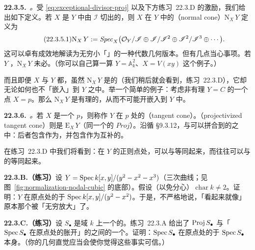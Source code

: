 \textbf{22.3.5.}\ \emph{\trNormal\trCone。}\quad 受 \eqref{eq:exceptional-divisor-proj} 以及下方\mbox{练习~22.3.D} 的激励，我们给出如下定义。若 $X$ 是 $Y$ 中由 $\mathscr{I}$ 切出的\trClosedSubscheme，则 $X$ 在 $Y$ 中的\textbf{\trNormal\trCone}（normal cone）$\mathrm{N}_X\,Y$ 定义为
\[
\tag{22.3.5.1}\label{eq:normal-cone}
\mathrm{N}_X\,Y:=\mathit{Spec}_X\bigl(\mathcal{O}_Y/\mathscr{I}\oplus\mathscr{I}/\mathscr{I}^2\oplus\mathscr{I}^2/\mathscr{I}^3\oplus\cdots\bigr).
\]
这可以卓有成效地解读为无穷小「\trTubularNeighborhood」的一种代数几何版本。但有几点当心事项。若 $Y$ \trSmooth，$\mathrm{N}_X\,Y$ 未必\trSmooth。（你可以自己算一算 $Y=\mathbb{A}^2_k$、$X=V(xy)$ 这个例子。）

而且即便 $X$ 与 $Y$ 都\trSmooth，虽然 $\mathrm{N}_X\,Y$ 是\trSmooth{}的（我们稍后就会看到，\mbox{练习~22.3.D}），它却无论如何也不「嵌入」到 $Y$ 之中。举一个简单的例子：考虑非有理\trCurve{} $Y=C$ 的一个\trSmooth{}点 $X=p$。那么 $\mathrm{N}_X\,Y$ 是有理的，从而不可能开嵌入到 $Y$ 中。

\textbf{22.3.6.}\ \emph{\trTangent\trCone。}\quad 若 $X$ 是一个\trClosedPoint{} $p$，则\trNormal\trCone{}称作 $Y$ 在 $p$ 处的\textbf{\trTangent\trCone}（tangent cone）。\textbf{\trProjectivization\trTangent\trCone}（projectivized tangent cone）则是\trExceptionalDivisor{} $\mathrm{E}_X\,Y$（同一个\trSheafOfGradedAlgebras{}的 $\mathit{Proj}$）。沿循 \S9.3.12，\trTangent\trCone{}与\trProjectivization\trTangent\trCone{}可以拼合到\trTangent\trCone{}的\trProjectiveCompletion{}之中：后者包含\trTangent\trCone{}作为\trOpenSubset，并包含\trProjectivization\trTangent\trCone{}作为互补的\trEffectiveCartierDivisor。

在\mbox{练习~22.3.D} 中我们将看到：在 $Y$ 的正则点处，\trTangent\trCone{}可以与\trTangentSpace{}等同起来，而\trNormal\trCone{}往往可以与\trNormalBundle{}的\trTotalSpace{}等同起来。

\textbf{22.3.B.（练习）}\quad 设 $Y=\operatorname{Spec} k[x,y]/(y^2-x^2-x^3)$（\trNode{}三次曲线；见图~\ref{fig:normalization-nodal-cubic} 的底部）。假设（以免分心）$\operatorname{char}k\neq 2$。证明：$Y$ 在原点处的\trTangent\trCone\trIsomorphic{}于 $\operatorname{Spec} k[x,y]/(y^2-x^2)$。于是，不严格地说，\trTangent\trCone「看起来就像」原本那个\trVariety{}被「无穷放大」了。

\textbf{22.3.C.（练习）}\quad 设 $S_\bullet$ 是域 $k$ 上一个\trFinitelyGenerated{}的\trGradedAlgebra。\mbox{练习~22.3.A} 给出了 $\operatorname{Proj} S_\bullet$ 与「$\operatorname{Spec} S_\bullet$ 在原点处的胀开」的\trExceptionalDivisor{}之间的一个\trIsomorphism。证明：$\operatorname{Spec} S_\bullet$ 在原点处的\trTangent\trCone\trIsomorphic{}于 $\operatorname{Spec} S_\bullet$ 本身。（你的几何直觉应当会使你觉得这些事实可信。）

